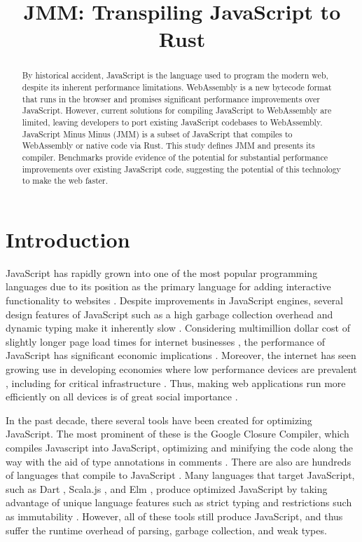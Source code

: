 \documentclass[12pt]{article}
\title{JMM: Transpiling JavaScript to Rust}
\begin{document}
	
	\maketitle
	
	\begin{abstract}
		By historical accident, JavaScript is the language used to program the modern web, despite its inherent performance limitations. WebAssembly is a new bytecode format that runs in the browser and promises significant performance improvements over JavaScript. However, current solutions for compiling JavaScript to WebAssembly are limited, leaving developers to port existing JavaScript codebases to WebAssembly. JavaScript Minus Minus (JMM) is a subset of JavaScript that compiles to WebAssembly or native code via Rust. This study defines JMM and presents its compiler. Benchmarks provide evidence of the potential for substantial performance improvements over existing JavaScript code, suggesting the potential of this technology to make the web faster.
		
	\end{abstract}
	
	\newpage
	
	\section{Introduction}
	
	JavaScript has rapidly grown into one of the most popular programming languages \cite{Byrne2016}\cite{Cass2017} due to its position as the primary language for adding interactive functionality to websites \cite{MDN2017}. Despite improvements in JavaScript engines, several design features of JavaScript such as a high garbage collection overhead and dynamic typing make it inherently slow \cite{Crawford2013}. Considering multimillion dollar cost of slightly longer page load times for internet businesses \cite{Eaton2012}, the performance of JavaScript has significant economic implications \cite{souders2008high}. Moreover, the internet has seen growing use in developing economies \cite{Poushter2016} where low performance devices are prevalent \cite{Poushter2015}, including for critical infrastructure \cite{Dews2014}. Thus, making web applications run more efficiently on all devices is of great social importance \cite{UN2012}.
	
	In the past decade, there several tools have been created for optimizing JavaScript. The most prominent of these is the Google Closure Compiler, which compiles Javascript into JavaScript, optimizing and minifying the code along the way with the aid of type annotations in comments \cite{ClosureCompiler}. There are also are hundreds of languages that compile to JavaScript \cite{Languages}. Many languages that target JavaScript, such as Dart \cite{mohanty2014dart}, Scala.js \cite{ScalaJS}, and Elm \cite{czaplicki2012elm}, produce optimized JavaScript by taking advantage of unique language features such as strict typing \cite{mohanty2014dart} and restrictions such as immutability \cite{Czaplicki2016}. However, all of these tools still produce JavaScript, and thus suffer the runtime overhead of parsing, garbage collection, and weak types.
	
\end{document}
